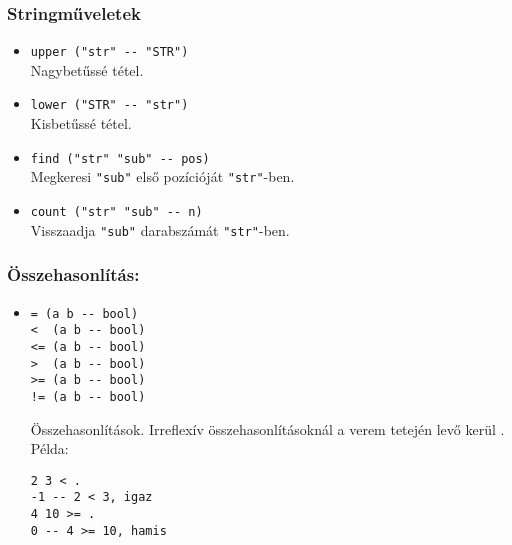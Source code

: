 \documentclass[a4paper]{article}
\begin{document}
\subsubsection*{Stringműveletek}
\begin{itemize}
\item \verb|upper ("str" -- "STR")|\\		Nagybetűssé tétel.
\item \verb|lower ("STR" -- "str")|\\		Kisbetűssé tétel.
\item \verb|find ("str" "sub" -- pos)|\\	Megkeresi \verb|"sub"| első pozícióját \verb|"str"|-ben.
\item \verb|count ("str" "sub" -- n)|\\		Visszaadja \verb|"sub"| darabszámát \verb|"str"|-ben.
\end{itemize}

\subsubsection*{Összehasonlítás: }
\begin{itemize}
\item \begin{verbatim}= (a b -- bool)
<  (a b -- bool)
<= (a b -- bool)
>  (a b -- bool)
>= (a b -- bool)
!= (a b -- bool)
\end{verbatim} Összehasonlítások. Irreflexív összehasonlításoknál a verem tetején levő kerül .\\ Példa: \begin{verbatim}2 3 < .
-1 -- 2 < 3, igaz
4 10 >= .
0 -- 4 >= 10, hamis\end{verbatim}
\end{itemize}
\end{document}
